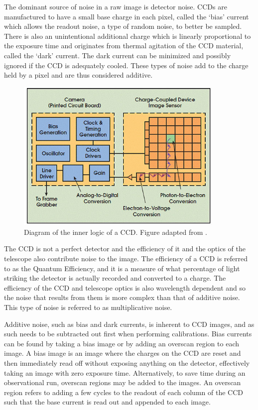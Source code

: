 The dominant source of noise in a raw image is detector noise. \glspl{CCD} are manufactured to have a small base charge in each pixel, called the `bias' current which allows the readout noise, a type of random noise, to better be sampled. There is also an unintentional additional charge which is linearly proportional to the exposure time and originates from thermal agitation of the \gls{CCD} material, called the `dark' current. The dark current can be minimized and possibly ignored if the \gls{CCD} is adequately cooled. These types of noise add to the charge held by a pixel and are thus considered additive.

\begin{figure}[t]
    \centering
    \includegraphics[width = 10cm]{figures/2_ccd.jpg}
    \caption{Diagram of the inner logic of a \gls{CCD}. Figure adapted from \cite{ccd_fig}.}
    \label{fig:ccd_diagram}
\end{figure}

The \gls{CCD} is not a perfect detector and the efficiency of it and the optics of the telescope also contribute noise to the image. The efficiency of a \gls{CCD} is referred to as the Quantum Efficiency, and it is a measure of what percentage of light striking the detector is actually recorded and converted to a charge. The efficiency of the \gls{CCD} and telescope optics is also wavelength dependent and so the noise that results from them is more complex than that of additive noise. This type of noise is referred to as multiplicative noise.

Additive noise, such as bias and dark currents, is inherent to \gls{CCD} images, and as such needs to be subtracted out first when performing calibrations. Bias currents can be found by taking a bias image or by adding an overscan region to each image. A bias image is an image where the charges on the \gls{CCD} are reset and then immediately read off without exposing anything on the detector, effectively taking an image with zero exposure time. Alternatively, to save time during an observational run, overscan regions may be added to the images. An overscan region refers to adding a few cycles to the readout of each column of the \gls{CCD} such that the base current is read out and appended to each image.

